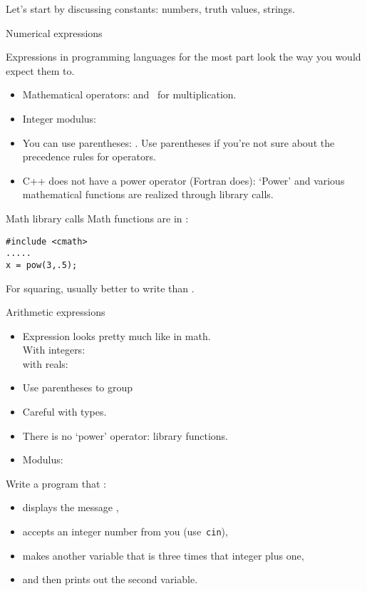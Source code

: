 Let's start by discussing constants:
numbers, truth values, strings.

 {Numerical expressions}

Expressions in
programming languages for the most part look the way you would expect
them to.
\begin{itemize}
\item Mathematical operators: \n{+ - /} and \n{*}~for multiplication.
\item Integer modulus:~
\item You can use parentheses: . Use parentheses if you're
  not sure about the precedence rules for operators.
\item C++ does not have a power operator (Fortran does): `Power' and
  various mathematical functions are realized through library calls.
\end{itemize}

\begin{block}{Math library calls}
  \label{sl:cmath}
  Math functions are in :
\begin{lstlisting}
#include <cmath>
.....
x = pow(3,.5);
\end{lstlisting}
For squaring, usually better to write  than .
\end{block}

\begin{slide}{Arithmetic expressions}
  \label{sl:arith-expr}
  \begin{itemize}
  \item
    Expression looks pretty much like in math.\\
    With integers: \\
    with reals: 
  \item Use parentheses to group 
  \item Careful with types.
  \item There is no `power' operator: library functions.
  \item Modulus: 
  \end{itemize}
\end{slide}

\begin{exercise}
  \label{ex:cin-cout3np1}
  Write a program that :
  \begin{itemize}
  \item displays the message ,
  \item accepts an integer number from you (use~\lstinline{cin}),
  \item makes another variable that is three times that integer plus one,
  \item and then prints out the second variable.
  \end{itemize}
\end{exercise}

